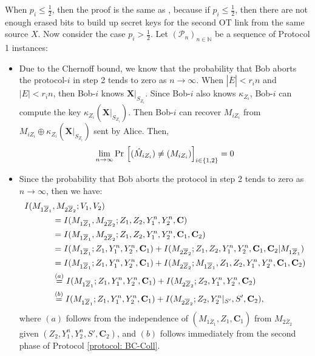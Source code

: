 \documentclass[runningheads]{llncs}
\newcounter{protocol}
\begin{document}
When $p_i\leq \frac12$, then the proof is the same as \cite{Rudolf1}, because if $p_i\leq\frac12$, then there are not enough erased bits to build up secret keys for the second OT link from the same source $X$. 
    Now consider the case $p_i>\frac12$. Let $(\mathcal{P}_n)_{n\in\mathbb{N}}$ be a sequence of Protocol 1 instances: 
\begin{itemize}
    \item Due to the Chernoff bound, we know that the probability that Bob aborts the protocol-$i$ in step 2 tends to zero as $n\rightarrow
    \infty$. When $|\overline{E}|<r_in$ and $|E|<r_in$, then Bob-$i$ knows $\mathbf{X}|_{S_{Z_i}}$. Since Bob-$i$ also knows $\kappa_{Z_i}$, Bob-$i$ can compute the key $\kappa_{Z_i}(\mathbf{X}|_{S_{Z_i}})$. Then Bob-$i$ can recover $M_{iZ_i}$ from $M_{iZ_i}\oplus\kappa_{Z_i}(\mathbf{X}|_{S_{Z_i}})$ sent by Alice. Then, \[
    \lim_{n\rightarrow\infty}\text{Pr}\,\left[(\hat{M}_{iZ_i})\neq (M_{iZ_i})\right]_{i\in\{1,2\}}= 0\\
    \]


    \item Since the probability that Bob aborts the protocol in step 2 tends to zero as $n \rightarrow \infty$, then we have:
\begin{align}\label{eq: mid}
      I (  M_{1\overline{Z}_1}&,M_{2\overline{Z}_2};V_1,V_2) \notag\\
      & = I (  M_{1\overline{Z}_1},M_{2\overline{Z}_2};Z_1, Z_2, Y_1^n, Y_2^n, \mathbf{C})\notag\\
      & = I (  M_{1\overline{Z}_1},M_{2\overline{Z}_2};Z_1, Z_2, Y_1^n, Y_2^n, \mathbf{C}_1, \mathbf{C}_2)\notag\\
      & = I (  M_{1\overline{Z}_1};Z_1, Y_1^n, Y_2^n,  \mathbf{C}_1) + I (  M_{2\overline{Z}_2};Z_1, Z_2, Y_1^n, Y_2^n,  \mathbf{C}_1, \mathbf{C}_2|M_{1\overline{Z}_1})\notag\\
      & = I (  M_{1\overline{Z}_1};Z_1, Y_1^n, Y_2^n,  \mathbf{C}_1) + I ( M_{2\overline{Z}_2};M_{1\overline{Z}_1}, Z_1, Z_2, Y_1^n, Y_2^n, \mathbf{C}_1,\mathbf{C}_2)\notag\\
      & \overset{(a)}{=} I (  M_{1\overline{Z}_1};Z_1, Y_1^n, Y_2^n,  \mathbf{C}_1) + I ( M_{2\overline{Z}_2}; Z_2, Y_1^n, Y_2^n, \mathbf{C}_2)\notag\\
      & \overset{(b)}{=} I (  M_{1\overline{Z}_1};Z_1, Y_1^n, Y_2^n,  \mathbf{C}_1) + I (  M_{2\overline{Z}_2};Z_2, Y_2^n|_{S'}, S', \mathbf{C}_2),
    \end{align}
    where $(a)$ follows from the independence of $(M_{1\overline{Z}_1},Z_1, \mathbf{C}_1)$ from $M_{2\overline{Z}_2}$ given $(Z_2, Y_1^n,Y_2^n, S', \mathbf{C}_2)$, and $(b)$ follows immediately from the second phase of Protocol \ref{protocol: BC-Coll}. 
    

\end{itemize}
\end{document}
